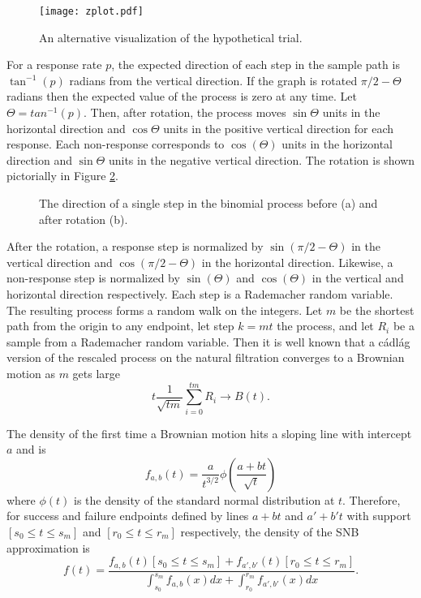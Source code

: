 \documentclass[12pt]{article}
\begin{document}
\begin{figure}[t!]
\centering
\texttt{[image: zplot.pdf]}
\caption{
An alternative visualization of the hypothetical trial.
}
\label{fig:zplot}
\end{figure}

For a response rate $p$, the expected direction of each step in the sample 
path is $\tan^{-1}(p)$ radians from the vertical direction.
If the graph is rotated $\pi/2- \Theta$ radians then the 
expected value of the process is zero at any time.
Let $\Theta = tan^{-1}(p)$. Then, after rotation, the process moves 
$\sin \Theta$ units in the horizontal direction and $\cos \Theta$ units in 
the positive vertical direction for each response. Each non-response 
corresponds to $\cos (\Theta)$ units in the horizontal direction and 
$\sin \Theta$ units in the negative vertical direction. The rotation is shown 
pictorially in Figure \ref{fig:theta_rot}.

\begin{figure}[bp!] 
\centering
{}
\hfill
{}
\caption{
The direction of a single step in the binomial process before (a) and after
rotation (b).
}
\label{fig:theta_rot}
\end{figure}

After the rotation, a response step is normalized by $\sin(\pi/2-\Theta)$ in the
vertical direction and $\cos(\pi/2 - \Theta)$ in the horizontal direction.
Likewise, a non-response step is normalized by $\sin(\Theta)$ and
$\cos(\Theta)$ in the vertical and horizontal direction respectively. Each
step is a Rademacher random variable. The
resulting process forms a random walk on the integers. Let $m$ be the
shortest path from the origin to any endpoint, let step $k=mt$
the process, and let $R_i$ be a sample from a Rademacher random variable. Then
it is well known that a c\'{a}dl\'{a}g version of the rescaled process on the
natural filtration converges to a Brownian motion as $m$ gets large
\begin{equation*}
t \frac{1}{\sqrt{t m}} \sum_{i=0}^{t m} R_i \rightarrow
B(t).
\end{equation*}

The density of the first time a Brownian motion hits a sloping line with
intercept $a$ and is \cite{Bachelier1900}
\begin{equation}
f_{a,b}(t) = \frac{a}{t^{3/2}} \phi \left(\frac{a + bt}{\sqrt{t}} \right)
\end{equation}
where $\phi(t)$ is the density of the standard normal distribution at $t$.
Therefore, for success and failure endpoints defined by lines 
$a + bt$ and $a' + b't$ with support $[s_0 \leq t \leq s_m]$ and 
$[r_0 \leq t \leq r_m]$ respectively, the density of the SNB approximation
is 
\begin{equation}
f(t) = \frac{ f_{a,b}(t)[s_0 \leq t \leq s_m] + 
  f_{a',b'}(t)[r_0 \leq t \leq r_m]}{
  \int_{s_0}^{s_m} f_{a,b}(x) dx + \int_{r_0}^{r_m} f_{a',b'}(x) dx}.
\end{equation}




\end{document}
